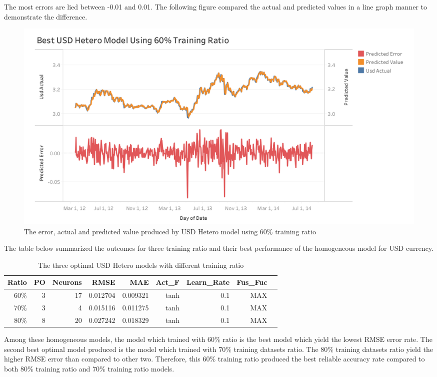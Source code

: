{{{{{{{			The most errors are lied between -0.01 and 0.01. The following figure compared the actual and predicted values in a line graph manner to demonstrate the difference.
			
			\begin{figure}[hbt!]\centering
				\includegraphics[width=1\textwidth]{best_usd_hetero_APV_60}
				\caption{The error, actual and predicted value produced by USD Hetero model using 60\% training ratio}
			\end{figure}
			
			The table below summarized the outcomes for three training ratio and their best performance of the homogeneous model for USD currency.
			
			\setlength{\tabcolsep}{0.5em} %
			{\renewcommand{\arraystretch}{1.2}
				
				\begin{table}[ht]
					\centering
					\begin{tabular}{@{}rrrrrrrrr@{}}
						\toprule
						\textbf{Ratio}&\textbf{PO}&\textbf{Neurons}& \textbf{RMSE} & \textbf{MAE} & \textbf{Act\_F} & \textbf{Learn\_Rate} &\textbf{ Fus\_Fuc}\\ 
						\midrule
						60\% & 3 & 17 & 0.012704 & 0.009321 & tanh & 0.1 & MAX \\
						70\% & 3 & 4 & 0.015116 & 0.011275 & tanh & 0.1 & MAX \\	
						80\% & 8 & 20 & 0.027242 & 0.018329 & tanh & 0.1 & MAX \\
						\hline
					\end{tabular}
					\hspace*{1cm}
					\caption{The three optimal USD Hetero models with different training ratio}
					
				\end{table}
Among these homogeneous models, the model which trained with 60\% ratio is the best model which yield the lowest RMSE error rate. The second best optimal model produced is the model which trained with 70\% training datasets ratio. The 80\% training datasets ratio yield the higher RMSE error than compared to other two. Therefore, this 60\% training ratio produced the best reliable accuracy rate compared to both  80\% training ratio  and 70\% training ratio models.
				
}}}}}}}}
